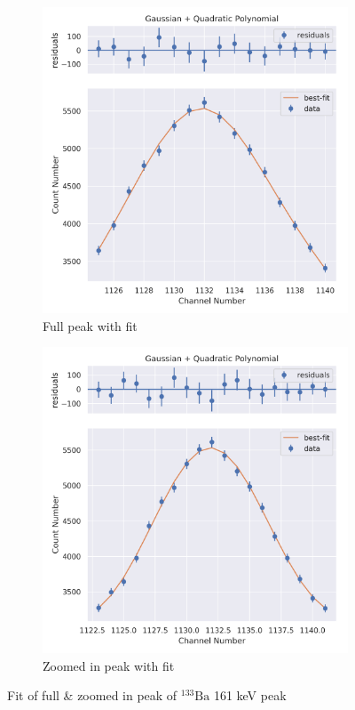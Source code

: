 \documentclass[11pt,a4paper]{article}
\newcommand{\element}[2]{$^{#2}\textrm{#1}$}
\begin{document}
\begin{figure}[H]
  \centering
  \begin{subfigure}{.5\linewidth}
    \centering
    \includegraphics[width=\linewidth]{./Images/Barium133/Quad/Quad_2_Full.png}
    \caption{Full peak with fit}
  \end{subfigure}%
  \begin{subfigure}{.5\linewidth}
    \centering
    \includegraphics[width=\linewidth]{./Images/Barium133/Quad/Quad_2_Zoom.png}
    \caption{Zoomed in peak with fit}
  \end{subfigure}
  \caption{Fit of full \& zoomed in peak of \element{Ba}{133} 161 keV peak}
\end{figure}
\end{document}
